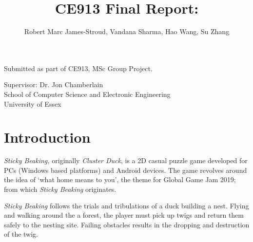 \documentclass[12pt]{article}
\title{CE913 Final Report: \game{Sticky Beaking}{}}
\author{Robert Marc James-Stroud, Vandana Sharma, Hao Wang, Su Zhang}
\newcommand{\game}[2]{\textit{#1}}{}
\begin{document}
	
\makeatletter
\begin{titlepage}
\null\vspace{5cm}
		
\begin{center}
\begin{LARGE}
\textbf{\@title}
\end{LARGE}
			
\vspace{2\baselineskip}
			
\begin{large}
\textbf{\@author}
\end{large}
			
\vspace{3cm}
			
Submitted as part of CE913, MSc Group Project.
			
\vfill
			
Supervisor: Dr. Jon Chamberlain\\
School of Computer Science and Electronic Engineering \\
University of Essex
			
\vspace{2\baselineskip}
			
\@date
\end{center}
		
\end{titlepage}
\makeatother
\clearpage

\tableofcontents
\newpage
\newpage
\listoffigures
\newpage
\listoftables
\newpage
{}
\setlength{\parskip}{1em}
\section{Introduction} 
\game{Sticky Beaking,}, originally \game{Cluster Duck}{}, is a 2D casual puzzle game developed for PCs (Windows based platforms) and Android devices. The game revolves around the idea of `what home means to you'\cite{ggj19theme}, the theme for Global Game Jam 2019; from which \game{Sticky Beaking}{ } originates.   

\game{Sticky Beaking}{ } follows the trials and tribulations of a duck building a nest. Flying and walking around the a forest, the player must pick up twigs and return them safely to the nesting site. Failing obstacles results in the dropping and destruction of the twig.    
\end{document}
